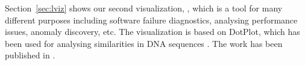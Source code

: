 Section~\ref{sec:lviz} shows our second visualization, , which
is a tool for many different purposes including software failure diagnostics,
analysing performance issues, anomaly discovery, etc.
The visualization is based on DotPlot, which has been used for
analysing similarities in DNA sequences \cite{maizel1981enhanced}.
The work has been published in \cite{wu2010visualizing}.
